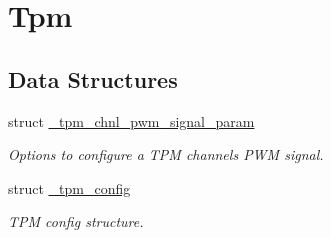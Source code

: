 \hypertarget{group__tpm}{}\section{Tpm}
\label{group__tpm}
\subsection*{Data Structures}
\begin{DoxyCompactItemize}
\item 
struct \mbox{\hyperlink{struct__tpm__chnl__pwm__signal__param}{\+\_\+tpm\+\_\+chnl\+\_\+pwm\+\_\+signal\+\_\+param}}
\begin{DoxyCompactList}\small\item\em Options to configure a T\+PM channel\textquotesingle{}s P\+WM signal. \end{DoxyCompactList}\item 
struct \mbox{\hyperlink{struct__tpm__config}{\+\_\+tpm\+\_\+config}}
\begin{DoxyCompactList}\small\item\em T\+PM config structure. \end{DoxyCompactList}\end{DoxyCompactItemize}
